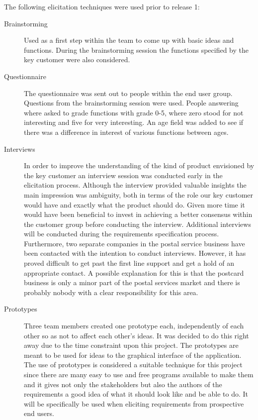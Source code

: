 \documentclass[10pt,a4paper]{article}
\begin{document}
The following elicitation techniques were used prior to release 1:
\begin{description}
\item[Brainstorming] Used as a first step within the team to come up with basic ideas and functions. During the brainstorming session the functions specified by the key customer were also considered.

\item[Questionnaire] The questionnaire was sent out to people within the end user group. Questions from the brainstorming session were used. People answering where asked to grade functions with grade 0-5, where zero stood for not interesting and five for very interesting. An age field was added to see if there was a difference in interest of various functions between ages. 

\item[Interviews] In order to improve the understanding of the kind of product envisioned by the key customer an interview session was conducted early in the elicitation process. Although the interview provided valuable insights the main impression was  ambiguity, both in terms of the role our key customer would have and exactly what the product should do. Given more time it would have been beneficial to invest in achieving a better consensus within the customer group before conducting the interview. Additional interviews will be conducted during the requirements specification process.
Furthermore, two separate companies in the postal service business have been contacted with the intention to conduct interviews. However, it has proved difficult to get past the first line support and get a hold of an appropriate contact. A possible explanation for this is that the postcard business is only a minor part of the postal services market and there is probably nobody with a clear responsibility for this area.  

\item[Prototypes] Three team members created one prototype each, independently of each other so as not to affect each other's ideas. It was decided to do this right away due to the time constraint upon this project. The prototypes are meant to be used for ideas to the graphical interface of the application. The use of prototypes is considered a suitable technique for this project since there are many easy to use and free programs available to make them and it gives not only the stakeholders but also the authors of the requirements a good idea of what it should look like and be able to do. It will be specifically be used when eliciting requirements from prospective end users.


\end{description}
\end{document}
